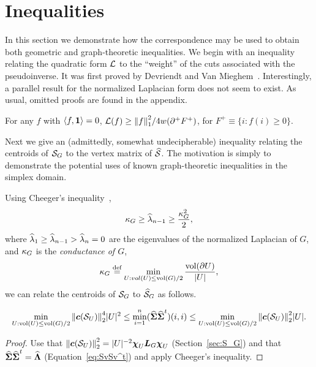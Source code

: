 \section{Inequalities}
\label{sec:inequalities}
In this section we demonstrate how the  correspondence may be used to obtain both geometric and graph-theoretic inequalities. We begin with an inequality relating the quadratic form $\mathcal{L}$ to the ``weight'' of the cuts associated with the pseudoinverse.  It was first proved by Devriendt and Van Mieghem~\cite{devriendt2018simplex}. Interestingly, a parallel result for the normalized Laplacian form does not seem to exist. As usual,  omitted proofs are found in the appendix. 
 
\begin{lemma}
	\label{lem:ineq_f1}
For any $f$ with $\langle f,\vb{1}\rangle=0$, $
\mathcal{L}(f) \geq \norm{f}_1^2/4w(\partial^+F^+)$, 
for $F^+\equiv \{i:f(i)\geq 0\}$. 
\end{lemma}

Next we give an (admittedly, somewhat undecipherable) inequality relating the centroids of $\mathcal{S}_G$ to the vertex matrix of $\widehat{\mathcal{S}}$. The motivation is simply to demonstrate the potential uses of known graph-theoretic inequalities in the simplex domain. 

Using Cheeger's inequality~\cite{chung1997spectral},
\begin{equation*}
\kappa_G \geq \widehat{\lambda}_{n-1} \geq \frac{\kappa_G^2}{2},
\end{equation*}  
where  $\widehat{\lambda}_1\geq \widehat{\lambda}_{n-1}>\widehat{\lambda}_n=0$ are the eigenvalues of the normalized Laplacian of  $G$, and $\kappa_G$ is the \emph{conductance of $G$}, 
\begin{equation*}
\kappa_G\overset{\text{def}}{=} \min_{U:vol(U)\leq \textnormal{vol}(G)/2} \frac{\textnormal{vol}(\partial U)}{|U|},
\end{equation*}
we can  relate  the centroids of $\mathcal{S}_G$ to $\widehat{\mathcal{S}}_G$ as follows. 

\begin{observation}
	\begin{equation*}
	\min_{U:\textnormal{vol}(U)\leq \textnormal{vol}(G)/2} \norm{\vb*{c}(\mathcal{S}_U)}_2^4 |U|^2  \leq \min_{i=1}^n (\widehat{\boldsymbol{\Sigma}}\widehat{\boldsymbol{\Sigma}}^t)(i,i) \leq \min_{U:\textnormal{vol}(U)\leq \textnormal{vol}(G)/2} \norm{\vb*{c}(\mathcal{S}_U)}_2^2 |U|.  
	\end{equation*}
\end{observation}
\begin{proof}
	Use that $\norm{\vb*{c}(\mathcal{S}_U)}_2^2 =  |U|^{-2} \boldsymbol{\chi}_U\vb*{L}_G\boldsymbol{\chi}_U$ (Section~\ref{sec:S_G}) and that $\widehat{\boldsymbol{\Sigma}}\widehat{\boldsymbol{\Sigma}}^t=\widehat{\vb{\Lambda}}$ (Equation~\eqref{eq:SvSv^t}) and apply Cheeger's inequality. 
\end{proof}

